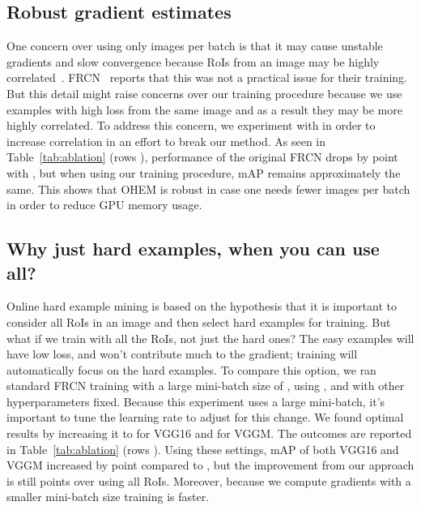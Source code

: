 \documentclass[10pt,twocolumn,letterpaper]{article}
\begin{document}
\subsection{Robust gradient estimates}\label{sec:fewer}
\vspace{-0.03in}
One concern over using only  images per batch is that it may cause unstable gradients and slow convergence because RoIs from an image may be highly correlated~\cite{minibatchSVM}. FRCN~\cite{frcn} reports that this was not a practical issue for their training. But this detail might raise concerns over our training procedure because we use examples with high loss from the same image and as a result they may be more highly correlated. To address this concern, we experiment with  in order to increase correlation in an effort to break our method. As seen in Table~\ref{tab:ablation} (rows ), performance of the original FRCN drops by  point with , but when using our training procedure, mAP remains approximately the same. This shows that OHEM is robust in case one needs fewer images per batch in order to reduce GPU memory usage.

\subsection{Why just hard examples, when you can use all?}\label{sec:allroi}
Online hard example mining is based on the hypothesis that it is important to consider all RoIs in an image and then select hard examples for training. But what if we train with all the RoIs, not just the hard ones? The easy examples will have low loss, and won't contribute much to the gradient; training will automatically focus on the hard examples. To compare this option, we ran standard FRCN training with a large mini-batch size of , using ,  and with other hyperparameters fixed. Because this experiment uses a large mini-batch, it's important to tune the learning rate to adjust for this change. We found optimal results by increasing it to  for VGG16 and  for VGGM. The outcomes are reported in Table~\ref{tab:ablation} (rows ). Using these settings, mAP of both VGG16 and VGGM increased by  point compared to , but the improvement from our approach is still  points over using all RoIs. Moreover, because we compute gradients with a smaller mini-batch size training is faster.
\end{document}
